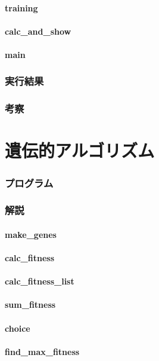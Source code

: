 \documentclass{jsarticle}
\begin{document}
\subsection{training}
\subsection{calc\_and\_show}
\subsection{main}
\section{実行結果}
\section{考察}

\part{遺伝的アルゴリズム}
\section{プログラム}
\section{解説}
\subsection{make\_genes}
\subsection{calc\_fitness}
\subsection{calc\_fitness\_list}
\subsection{sum\_fitness}
\subsection{choice}
\subsection{find\_max\_fitness}
\end{document}
